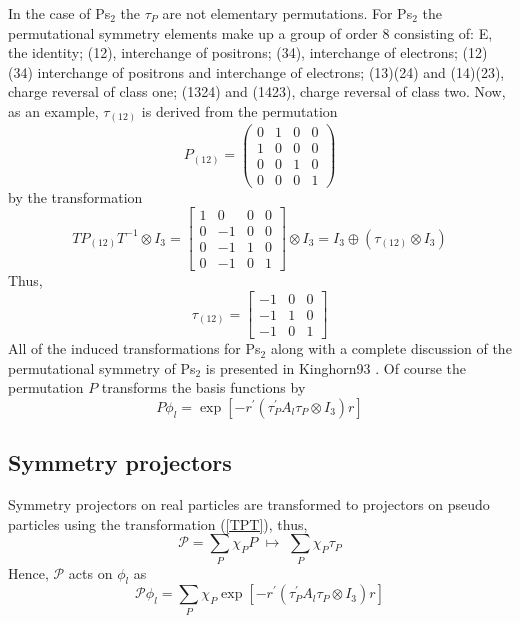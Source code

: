 \documentclass[12pt,thmsa,suthesis,verbatim]{report}
\begin{document}
In the case of Ps$_2$ the $\tau _P$ are not elementary permutations. For Ps$%
_2$ the permutational symmetry elements make up a group of order 8
consisting of: E, the identity; (12), interchange of positrons; (34),
interchange of electrons; (12)(34) interchange of positrons and interchange
of electrons; (13)(24) and (14)(23), charge reversal of class one; (1324)
and (1423), charge reversal of class two. Now, as an example, $\tau _{(12)}$
is derived from the permutation 
\begin{equation}
P_{(12)}=\left( 
\begin{array}{cccc}
0 & 1 & 0 & 0 \\ 
1 & 0 & 0 & 0 \\ 
0 & 0 & 1 & 0 \\ 
0 & 0 & 0 & 1
\end{array}
\right)
\end{equation}
by the transformation 
\begin{equation}
TP_{\left( 12\right) }T^{-1}\otimes I_3=\left[ 
\begin{array}{cccc}
1 & 0 & 0 & 0 \\ 
0 & -1 & 0 & 0 \\ 
0 & -1 & 1 & 0 \\ 
0 & -1 & 0 & 1
\end{array}
\right] \otimes I_3=I_3\oplus \left( \tau _{\left( 12\right) }\otimes
I_3\right)
\end{equation}
Thus, 
\begin{equation}
\tau _{\left( 12\right) }=\left[ 
\begin{array}{ccc}
-1 & 0 & 0 \\ 
-1 & 1 & 0 \\ 
-1 & 0 & 1
\end{array}
\right]
\end{equation}
All of the induced transformations for Ps$_2$ along with a complete
discussion of the permutational symmetry of Ps$_2$ is presented in Kinghorn93%
\cite{Kinghorn93}. Of course the permutation $P$ transforms the basis
functions by 
\begin{equation}
P\phi _l=\exp \left[ -r^{\prime }\left( \tau _P^{\prime }A_l\tau _P\otimes
I_3\right) r\right]
\end{equation}

\subsection{Symmetry projectors}

Symmetry projectors on real particles are transformed to projectors on
pseudo particles using the transformation (\ref{TPT}), thus, 
\begin{equation}
\mathcal{P}=\sum_P\chi _PP\,\,\mapsto \,\,\sum_P\chi _P\tau _P
\end{equation}
Hence, $\mathcal{P}$ acts on $\phi _l$ as 
\begin{equation}
\mathcal{P}\phi _l=\sum_P\chi _P\exp \left[ -r^{\prime }\left( \tau
_P^{\prime }A_l\tau _P\otimes I_3\right) r\right]
\end{equation}
\end{document}
